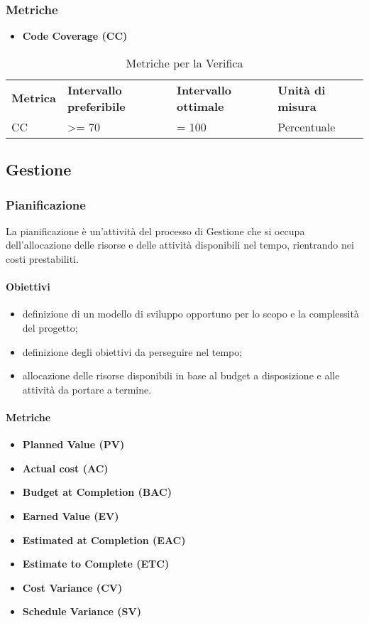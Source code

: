 \subsubsection{Metriche}
\begin{itemize}
	\item \textbf{Code Coverage (CC)}
\end{itemize}

\renewcommand{\arraystretch}{2.2}
\begin{longtable}{|C{2.5cm}|C{3.25cm}|C{3.25cm}|C{3cm}|}

	\caption{Metriche per la Verifica}\\
	\hline

	\textbf{Metrica} & \textbf{Intervallo preferibile}  & \textbf{Intervallo ottimale} & \textbf{Unità di misura}
	\tabularnewline
	\endfirsthead

	CC & >= 70  & = 100 & Percentuale \\

\end{longtable}


\subsection{Gestione}
\subsubsection{Pianificazione}
La pianificazione è un'attività del processo di Gestione che si occupa dell'allocazione delle risorse e delle attività disponibili nel tempo, rientrando nei costi prestabiliti.
\paragraph{Obiettivi}
\begin{itemize}
	\item definizione di un modello di sviluppo opportuno per lo scopo e la complessità del progetto;
	\item definizione degli obiettivi da perseguire nel tempo;
	\item allocazione delle risorse disponibili in base al budget a disposizione e alle attività da portare a termine.
\end{itemize}
\paragraph{Metriche}
\begin{itemize}
	\item \textbf{Planned Value (PV)}
	\item \textbf{Actual cost (AC)}
	\item \textbf{Budget at Completion (BAC)}
	\item \textbf{Earned Value (EV)}
	\item \textbf{Estimated at Completion (EAC)}
	\item \textbf{Estimate to Complete (ETC)}
	\item \textbf{Cost Variance	(CV)}
	\item \textbf{Schedule Variance	(SV)}
\end{itemize}

